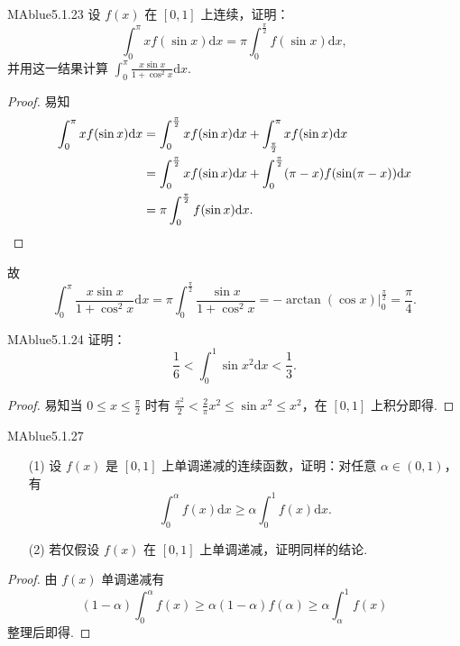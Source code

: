 \begin{problem}{MAblue}{5.1.23}
    设 $f(x)$ 在 $[0, 1]$ 上连续，证明：
    \[
        \int_0^\pi x f(\sin x) \mathrm dx = \pi \int_0^{\frac\pi 2} f(\sin x) \mathrm dx,
    \]
    并用这一结果计算 $\int_0^\pi \frac{x\sin x}{1+\cos^2x} \mathrm dx$.
\end{problem}

\begin{proof}
    易知
    \begin{align*}
        \int_0^{\pi} x f(\sin x) \mathrm dx &= \int_0^{\frac \pi 2} x f(\sin x) \mathrm dx + \int_{\frac \pi 2}^{\pi} x f(\sin x) \mathrm dx \\
        &= \int_0^{\frac \pi 2} x f(\sin x) \mathrm dx + \int_0^{\frac \pi 2} (\pi - x) f( \sin(\pi - x) ) \mathrm dx \\
        &= \pi \int_0^{\frac \pi 2} f(\sin x) \mathrm dx. \qedhere
    \end{align*}
\end{proof}
{\flushleft 故}
\[
    \int_0^{\pi} \frac{x \sin x}{1 + \cos^2 x} \mathrm dx = \pi \int_0^{\frac \pi 2} \frac{\sin x}{1 + \cos^2 x} = -\arctan(\cos x) \bigg|_0^{\frac \pi 2} = \frac \pi 4.
\]

\begin{problem}{MAblue}{5.1.24}
    证明：
    \[
        \frac 1 6 < \int_0^1 \sin x^2 \mathrm dx < \frac 1 3.
    \]
\end{problem}

\begin{proof}
    易知当 $0 \leqslant x \leqslant \frac \pi 2$ 时有 $\frac {x^2} 2 < \frac 2 \pi x^2 \leqslant \sin x^2 \leqslant x^2$，在 $[0, 1]$ 上积分即得.
\end{proof}

\begin{problem}{MAblue}{5.1.27}
    \begin{enumerate}
        \item[(1)]
        设 $f(x)$ 是 $[0, 1]$ 上单调递减的连续函数，证明：对任意 $\alpha \in (0, 1)$，有
        \[
            \int_0^\alpha f(x) \mathrm dx \geqslant \alpha \int_0^1 f(x) \mathrm dx.
        \]
        \item[(2)]
        若仅假设 $f(x)$ 在 $[0, 1]$ 上单调递减，证明同样的结论.
    \end{enumerate}
\end{problem}

\begin{proof}
    由 $f(x)$ 单调递减有
    \[
        (1 - \alpha) \int_0^\alpha f(x) \geqslant \alpha (1 - \alpha) f(\alpha) \geqslant \alpha \int_\alpha^1 f(x)
    \]
    整理后即得.
\end{proof}

